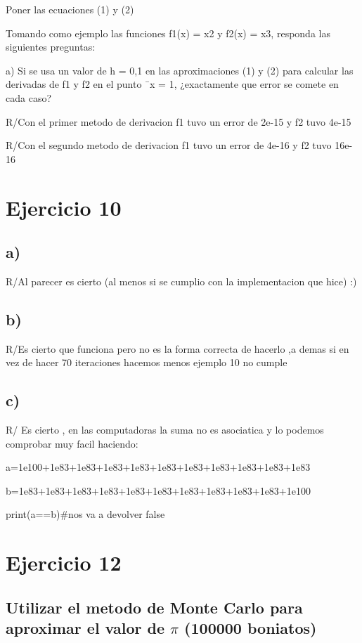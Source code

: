 \documentclass[a4paper,12pt]{article}
\begin{document}
Poner las ecuaciones (1) y (2)

Tomando como ejemplo las funciones f1(x) = x2 y f2(x) = x3, responda las siguientes preguntas:

a) Si se usa un valor de h = 0,1 en las aproximaciones (1) y (2) para calcular las derivadas de
f1 y f2 en el punto ¯x = 1, ¿exactamente que error se comete en cada caso?

R/Con el primer metodo de derivacion f1 tuvo un error de 2e-15 y f2 tuvo 4e-15

R/Con el segundo metodo de derivacion f1 tuvo un error de 4e-16 y f2 tuvo 16e-16

\section*{Ejercicio 10}
\subsection*{a)}
R/Al parecer es cierto (al menos si se cumplio con la implementacion que hice) :)
\subsection*{b)}
R/Es cierto que funciona pero no es la forma correcta de hacerlo ,a demas si en vez de 
hacer 70 iteraciones hacemos menos ejemplo 10 no cumple
\subsection*{c)}
R/ Es cierto , en las computadoras la suma no es asociatica y lo podemos comprobar muy facil 
haciendo:

a=1e100+1e83+1e83+1e83+1e83+1e83+1e83+1e83+1e83+1e83+1e83

b=1e83+1e83+1e83+1e83+1e83+1e83+1e83+1e83+1e83+1e83+1e100

print(a==b)\#nos va a devolver false

\section*{Ejercicio 12}
\subsection*{Utilizar el metodo de Monte Carlo para aproximar el valor de $\pi$ (100000 boniatos)}



\end{document}
